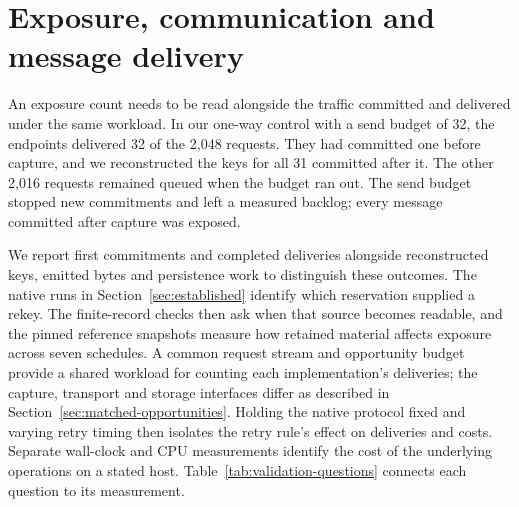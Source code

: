 \documentclass[pdflatex]{sn-jnl}
\theoremstyle{thmstyleone}
\theoremstyle{thmstylethree}
\theoremstyle{thmstyletwo}
\begin{document}
\section{Exposure, communication and message delivery}
\label{sec:evaluation}

An exposure count needs to be read alongside the traffic committed and
delivered under the same workload. In our one-way control with a send
budget of 32, the endpoints delivered 32 of the 2,048 requests. They had committed
one before capture, and we reconstructed the keys for all 31 committed
after it. The other 2,016 requests remained queued when the budget ran
out. The send budget stopped new commitments and left a measured
backlog; every message committed after capture was exposed.

We report first commitments and completed deliveries alongside
reconstructed keys, emitted bytes and persistence work to distinguish
these outcomes. The native runs in Section~\ref{sec:established}
identify which reservation supplied a rekey. The finite-record checks
then ask when that source becomes readable, and the pinned reference
snapshots measure how retained material affects exposure across seven
schedules. A common request stream and opportunity budget provide a
shared workload for counting each implementation's deliveries;
the capture, transport and storage interfaces differ as described in
Section~\ref{sec:matched-opportunities}. Holding the native protocol fixed
and varying retry timing then isolates the retry rule's effect on
deliveries and costs.
Separate wall-clock and CPU measurements identify the cost of the
underlying operations on a stated host.
Table~\ref{tab:validation-questions} connects each question to its
measurement.
\end{document}
